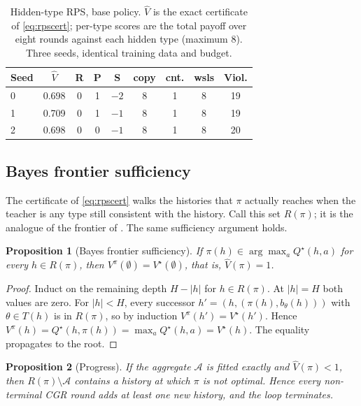 \documentclass[conference]{IEEEtran}
\newtheorem{proposition}{Proposition}
\begin{document}
\begin{table}[t]
\centering
\caption{Hidden-type RPS, base policy. $\hat V$ is the exact certificate of \eqref{eq:rpscert}; per-type scores are the total payoff over eight rounds against each hidden type (maximum 8). Three seeds, identical training data and budget.}
\label{tab:rpsbase}
\setlength{\tabcolsep}{3pt}
\footnotesize
\begin{tabular}{@{}lcccccccc@{}}
\toprule
\textbf{Seed} & $\hat V$ & \textbf{R} & \textbf{P} & \textbf{S} & \textbf{copy} & \textbf{cnt.} & \textbf{wsls} & \textbf{Viol.} \\
\midrule
0 & 0.698 & 0 & 1 & $-2$ & 8 & 1 & 8 & 19 \\
1 & 0.709 & 0 & 1 & $-1$ & 8 & 1 & 8 & 19 \\
2 & 0.698 & 0 & 0 & $-1$ & 8 & 1 & 8 & 20 \\
\bottomrule
\end{tabular}
\end{table}

\subsection{Bayes frontier sufficiency}
The certificate of \eqref{eq:rpscert} walks the histories that $\pi$ actually reaches when the teacher is any type still consistent with the history. Call this set $R(\pi)$; it is the analogue of the frontier of . The same sufficiency argument holds.

\begin{proposition}[Bayes frontier sufficiency]
\label{prop:rpsfrontier}
If $\pi(h)\in\arg\max_a Q^{\star}(h,a)$ for every $h\in R(\pi)$, then $V^{\pi}(\emptyset)=V^{\star}(\emptyset)$, that is, $\hat V(\pi)=1$.
\end{proposition}

\begin{proof}
Induct on the remaining depth $H-|h|$ for $h\in R(\pi)$. At $|h|=H$ both values are zero. For $|h|<H$, every successor $h'=(h,(\pi(h),b_\theta(h)))$ with $\theta\in T(h)$ is in $R(\pi)$, so by induction $V^{\pi}(h')=V^{\star}(h')$. Hence
$V^{\pi}(h)=Q^{\star}(h,\pi(h))=\max_a Q^{\star}(h,a)=V^{\star}(h)$.
The equality propagates to the root.
\end{proof}

\begin{proposition}[Progress]
\label{prop:rpsprogress}
If the aggregate $\mathcal{A}$ is fitted exactly and $\hat V(\pi)<1$, then $R(\pi)\setminus\mathcal{A}$ contains a history at which $\pi$ is not optimal. Hence every non-terminal CGR round adds at least one new history, and the loop terminates.
\end{proposition}
\end{document}
